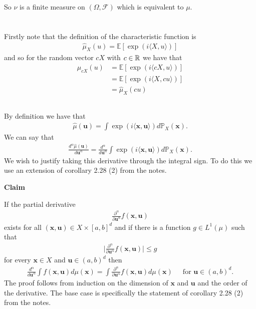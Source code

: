 \documentclass{unswmaths}
\begin{document}
So $ \nu $ is a finite measure on $ (\Omega, \mathcal{F}) $ which is equivalent to $ \mu $.
\section{}
\subsection{}
Firstly note that the definition of the characteristic function is
\begin{align}
	\hat{\mu}_X(u) = \mathbb{E}[\exp(i\langle X, u \rangle)]
\end{align}
and so for the random vector $ cX $ with $ c \in \mathbb{R} $ we have that
\begin{align}
	\hat{\mu}_{cX}(u) &= \mathbb{E}[ \exp(i \langle cX, u \rangle) ] \\
		 &= \mathbb{E}[ \exp(i \langle X, cu \rangle) ] \\
		 &= \hat{\mu}_{X}(cu)
\end{align}
\subsection{}
By definition we have that
\begin{align}
	\hat{\mu}(\mathbf{u}) = \int \exp(i \langle \mathbf{x}, \mathbf{u} \rangle ) d\mathbb{P}_{X}(\mathbf{x}).
\end{align}
We can say that
\begin{align}
	\frac{d^\alpha \hat{\mu}(\mathbf{u})}{d \mathbf{u}^\alpha} = \frac{d^\alpha}{d \mathbf{u}^\alpha} \int \exp(i \langle \mathbf{x}, \mathbf{u} \rangle ) d\mathbb{P}_{X}(\mathbf{x}).
\end{align}
We wish to justify taking this derivative through the integral sign. To do this we use an extension of corollary 2.28 (2) from the notes.
\clearpage
\begin{mdframed}
\textbf{Claim}

If the partial derivative 
\begin{align}
	\frac{\partial^\alpha}{\partial\mathbf{u}^\alpha} f(\mathbf{x}, \mathbf{u})
\end{align}
exists for all $ (\mathbf{x}, \mathbf{u}) \in X \times [a, b]^d $ and if there is a function $ g \in L^{1}(\mu) $ such that
\begin{align}
	\Big| \frac{\partial^\alpha}{\partial \mathbf{u}^\alpha} f(\mathbf{x}, \mathbf{u}) \Big| \leq g
\end{align}
for every $ \mathbf{x} \in X $ and $ \mathbf{u} \in (a,b)^d $ then
\begin{align}
	\frac{d^\alpha}{d\mathbf{u}^\alpha} \int f(\mathbf{x}, \mathbf{u}) d\mu(\mathbf{x}) = \int \frac{\partial^\alpha}{\partial \mathbf{u}^\alpha} f(\mathbf{x}, \mathbf{u}) d\mu(\mathbf{x}) \ \ \ \ \ \text{ for } \mathbf{u} \in (a,b)^d.
\end{align}
The proof follows from induction on the dimension of $ \mathbf{x} $ and $ \mathbf{u} $ and the order of the derivative. The base case is specifically the statement of  corollary 2.28 (2) from the notes.
\end{mdframed}
\end{document}
